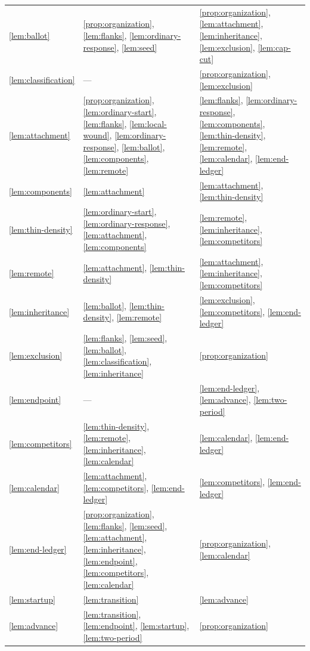 \begin{longtable}{@{}>{\raggedright\arraybackslash}p{.14\linewidth}>{\raggedright\arraybackslash}p{.40\linewidth}>{\raggedright\arraybackslash}p{.38\linewidth}@{}}
\ref{lem:ballot} & \ref{prop:organization}, \ref{lem:flanks}, \ref{lem:ordinary-response}, \ref{lem:seed} & \ref{prop:organization}, \ref{lem:attachment}, \ref{lem:inheritance}, \ref{lem:exclusion}, \ref{lem:cap-cut} \\
\ref{lem:classification} & --- & \ref{prop:organization}, \ref{lem:exclusion} \\
\ref{lem:attachment} & \ref{prop:organization}, \ref{lem:ordinary-start}, \ref{lem:flanks}, \ref{lem:local-wound}, \ref{lem:ordinary-response}, \ref{lem:ballot}, \ref{lem:components}, \ref{lem:remote} & \ref{lem:flanks}, \ref{lem:ordinary-response}, \ref{lem:components}, \ref{lem:thin-density}, \ref{lem:remote}, \ref{lem:calendar}, \ref{lem:end-ledger} \\
\ref{lem:components} & \ref{lem:attachment} & \ref{lem:attachment}, \ref{lem:thin-density} \\
\ref{lem:thin-density} & \ref{lem:ordinary-start}, \ref{lem:ordinary-response}, \ref{lem:attachment}, \ref{lem:components} & \ref{lem:remote}, \ref{lem:inheritance}, \ref{lem:competitors} \\
\ref{lem:remote} & \ref{lem:attachment}, \ref{lem:thin-density} & \ref{lem:attachment}, \ref{lem:inheritance}, \ref{lem:competitors} \\
\ref{lem:inheritance} & \ref{lem:ballot}, \ref{lem:thin-density}, \ref{lem:remote} & \ref{lem:exclusion}, \ref{lem:competitors}, \ref{lem:end-ledger} \\
\ref{lem:exclusion} & \ref{lem:flanks}, \ref{lem:seed}, \ref{lem:ballot}, \ref{lem:classification}, \ref{lem:inheritance} & \ref{prop:organization} \\
\ref{lem:endpoint} & --- & \ref{lem:end-ledger}, \ref{lem:advance}, \ref{lem:two-period} \\
\ref{lem:competitors} & \ref{lem:thin-density}, \ref{lem:remote}, \ref{lem:inheritance}, \ref{lem:calendar} & \ref{lem:calendar}, \ref{lem:end-ledger} \\
\ref{lem:calendar} & \ref{lem:attachment}, \ref{lem:competitors}, \ref{lem:end-ledger} & \ref{lem:competitors}, \ref{lem:end-ledger} \\
\ref{lem:end-ledger} & \ref{prop:organization}, \ref{lem:flanks}, \ref{lem:seed}, \ref{lem:attachment}, \ref{lem:inheritance}, \ref{lem:endpoint}, \ref{lem:competitors}, \ref{lem:calendar} & \ref{prop:organization}, \ref{lem:calendar} \\
\ref{lem:startup} & \ref{lem:transition} & \ref{lem:advance} \\
\ref{lem:advance} & \ref{lem:transition}, \ref{lem:endpoint}, \ref{lem:startup}, \ref{lem:two-period} & \ref{prop:organization} \\

\end{longtable}
